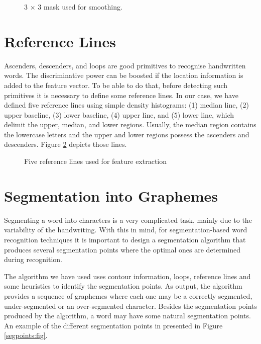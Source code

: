 \documentclass{article}[14pt, oneside, a4paper, times]
\begin{document}
\begin{figure}[htbp]
   \centering
   \caption{3 $\times$ 3 mask used for smoothing.}
   \label{mask:fig}
\end{figure}

\section{Reference Lines}

Ascenders, descenders, and loops are good primitives to recognise handwritten words. The discriminative power can be boosted if the location information is added to the feature vector. To be able to do that, before detecting such primitives it is necessary to define some reference lines. In our case, we have defined five reference lines using simple density histograms: (1) median line, (2) upper baseline, (3) lower baseline, (4) upper line, and (5) lower line, which delimit the upper, median, and lower regions. Usually, the median region contains the lowercase letters and the upper and lower regions possess the ascenders and descenders. Figure \ref{reflines:fig} depicts those lines.

\begin{figure}[htbp]
   \centering
   \caption{Five reference lines used for feature extraction \cite{Marisa03}}
   \label{reflines:fig}
\end{figure}

\section{Segmentation into Graphemes}

Segmenting a word into characters is a very complicated task, mainly due to the variability of the handwriting. With this in mind, for segmentation-based word recognition techniques it is important to design a segmentation algorithm that produces several segmentation points where the optimal ones are determined during recognition.

The algorithm we have used uses contour information, loops, reference lines and some heuristics to identify the segmentation points. As output, the algorithm provides a sequence of graphemes where each one may be a correctly segmented, under-segmented or an over-segmented character. Besides the segmentation points produced by the algorithm, a word may have some natural segmentation points. An example of the different segmentation points in presented in Figure \ref{segpoints:fig}.
\end{document}
